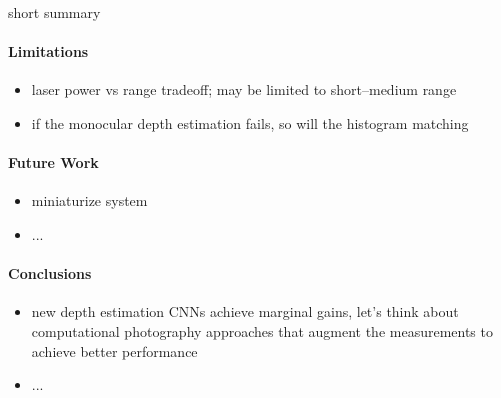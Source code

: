 short summary

\paragraph{Limitations}

\begin{itemize}
	\item laser power vs range tradeoff; may be limited to short--medium range
	\item if the monocular depth estimation fails, so will the histogram matching 
\end{itemize}

\paragraph{Future Work}

\begin{itemize}
	\item miniaturize system
	\item ...
\end{itemize}

\paragraph{Conclusions}

\begin{itemize}
	\item new depth estimation CNNs achieve marginal gains, let's think about computational photography approaches that augment the measurements to achieve better performance
	\item ...
\end{itemize}